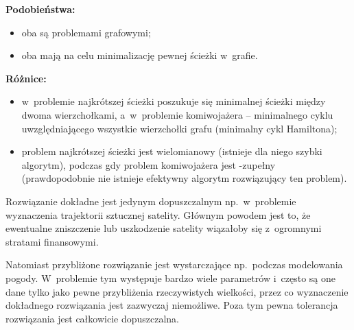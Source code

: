 \exercise %
\noindent\textbf{Podobieństwa:}
\begin{itemize}
	\item oba są problemami grafowymi;
	\item oba mają na celu minimalizację pewnej ścieżki w~grafie.
\end{itemize}
\bigskip
\noindent\textbf{Różnice:}
\begin{itemize}
	\item w~problemie najkrótszej ścieżki poszukuje się minimalnej ścieżki między dwoma wierzchołkami, a~w~problemie komiwojażera -- minimalnego cyklu uwzględniającego wszystkie wierzchołki grafu (minimalny cykl Hamiltona);
	\item problem najkrótszej ścieżki jest wielomianowy (istnieje dla niego szybki algorytm), podczas gdy problem komiwojażera jest \NPclass-zupełny (prawdopodobnie nie istnieje efektywny algorytm rozwiązujący ten problem).
\end{itemize}

\exercise %
Rozwiązanie dokładne jest jedynym dopuszczalnym np.\ w~problemie wyznaczenia trajektorii sztucznej satelity.
Głównym powodem jest to, że ewentualne zniszczenie lub uszkodzenie satelity wiązałoby się z~ogromnymi stratami finansowymi.

Natomiast przybliżone rozwiązanie jest wystarczające np.\ podczas modelowania pogody.
W~problemie tym występuje bardzo wiele parametrów i~często są one dane tylko jako pewne przybliżenia rzeczywistych wielkości, przez co wyznaczenie dokładnego rozwiązania jest zazwyczaj niemożliwe.
Poza tym pewna tolerancja rozwiązania jest całkowicie dopuszczalna.
